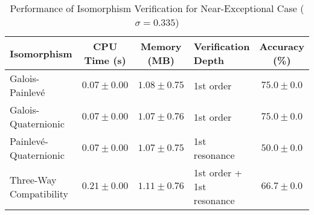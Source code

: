\begin{table}[h]
\centering
\caption{Performance of Isomorphism Verification for Near-Exceptional Case ($\sigma = 0.335$)}
\label{tab:verification_performance}
\small
\begin{tabular}{lccp{2.5cm}c}
\toprule
Isomorphism & CPU Time (s) & Memory (MB) & Verification Depth & Accuracy (\%) \\
\midrule
Galois-Painlevé & $0.07 \pm 0.00$ & $1.08 \pm 0.75$ & 1st order & $75.0 \pm 0.0$ \\
Galois-Quaternionic & $0.07 \pm 0.00$ & $1.07 \pm 0.76$ & 1st order & $75.0 \pm 0.0$ \\
Painlevé-Quaternionic & $0.07 \pm 0.00$ & $1.07 \pm 0.75$ & 1st resonance & $50.0 \pm 0.0$ \\
Three-Way Compatibility & $0.21 \pm 0.00$ & $1.11 \pm 0.76$ & 1st order + 1st resonance & $66.7 \pm 0.0$ \\
\bottomrule
\end{tabular}
\end{table}
